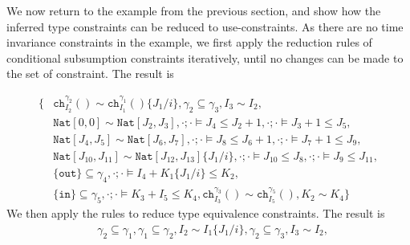 %
\begin{example}\label{examp:consredu}
We now return to the example from the previous section, and show how the inferred type constraints can be reduced to use-constraints. As there are no time invariance constraints in the example, we first apply the reduction rules of conditional subsumption constraints iteratively, until no changes can be made to the set of constraint. The result is

\begin{align*}
    \{&\texttt{ch}^{\gamma_2}_{I_2}()\sim\texttt{ch}^{\gamma_1}_{I_1}()\{J_1/i\},
    \gamma_2 \subseteq \gamma_3, I_3\sim I_2,\\
    &\texttt{Nat}[0,0] \sim \texttt{Nat}[J_2,J_3],
    \cdot;\cdot\vDash J_4 \leq J_2+1, \cdot;\cdot\vDash J_3+1 \leq J_5 ,\\
    &\texttt{Nat}[J_4,J_5] \sim \texttt{Nat}[J_6,J_7], 
    \cdot;\cdot\vDash J_8 \leq J_6+1,\cdot;\cdot\vDash J_7+1 \leq J_9,\\
    &  \texttt{Nat}[J_{10},J_{11}] \sim \texttt{Nat}[J_{12},J_{13}]\{J_1/i\},
    \cdot;\cdot\vDash J_{10} \leq J_8, \cdot;\cdot\vDash J_9 \leq J_{11} , \\
    & \{\texttt{out}\} \subseteq \gamma_4,
    \cdot;\cdot\vDash I_4 + K_1\{J_1/i\} \leq K_2,\\
    & \{\texttt{in}\} \subseteq \gamma_5,\cdot;\cdot\vDash K_3 + I_5 \leq K_4,\texttt{ch}^{\gamma_3}_{I_3}() \sim \texttt{ch}^{\gamma_5}_{I_5}(),K_2 \sim K_4\}
\end{align*}
%
We then apply the rules to reduce type equivalence constraints. The result is
%
\begin{align*}
    &\gamma_2 \subseteq \gamma_1, \gamma_1 \subseteq \gamma_2, I_2 \sim I_1\{J_1/i\},\gamma_2 \subseteq \gamma_3, I_3\sim I_2,\\

\end{align*}
\end{example}
